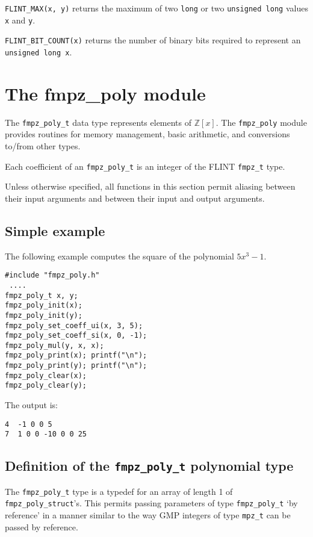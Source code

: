 \documentclass[a4paper,10pt]{article}
\newcommand{\Z}{\mathbb{Z}}
\newcommand{\code}{\lstinline}
\begin{document}
\code{FLINT_MAX(x, y)} returns the maximum of two \code{long} or two \code{unsigned long} values \code{x} and \code{y}.

\code{FLINT_BIT_COUNT(x)} returns the number of binary bits required to represent an \code{unsigned long x}.

\section{The fmpz\_poly module}

The \code{fmpz_poly_t} data type represents elements of $\Z[x]$. The \code{fmpz_poly} module provides routines for memory management, basic arithmetic, and conversions to/from other types.

Each coefficient of an \code{fmpz_poly_t} is an integer of the FLINT \code{fmpz_t} type. 

Unless otherwise specified, all functions in this section permit aliasing between their input arguments and between their input and output arguments. 

\subsection{Simple example}

The following example computes the square of the polynomial $5x^3 - 1$.

\begin{lstlisting}
#include "fmpz_poly.h"
 ....
fmpz_poly_t x, y;
fmpz_poly_init(x);
fmpz_poly_init(y);
fmpz_poly_set_coeff_ui(x, 3, 5);
fmpz_poly_set_coeff_si(x, 0, -1);
fmpz_poly_mul(y, x, x);
fmpz_poly_print(x); printf("\n");
fmpz_poly_print(y); printf("\n");
fmpz_poly_clear(x);
fmpz_poly_clear(y);
\end{lstlisting}

The output is:

\begin{lstlisting}
4  -1 0 0 5
7  1 0 0 -10 0 0 25
\end{lstlisting}

\subsection{Definition of the \code{fmpz_poly_t} polynomial type}

The \code{fmpz_poly_t} type is a typedef for an array of length 1 of \code{fmpz_poly_struct}'s. This permits passing parameters  of type \code{fmpz_poly_t} `by reference' in a manner similar to the way GMP integers of type \code{mpz_t} can be passed by reference. 
\end{document}
